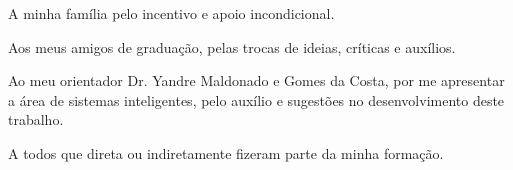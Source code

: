 
\begin{agradecimentos}[AGRADECIMENTOS]

A minha família pelo incentivo e apoio incondicional.
\par Aos meus amigos de graduação, pelas trocas de ideias, críticas e auxílios.
\par Ao meu orientador Dr. Yandre Maldonado e Gomes da Costa, por me apresentar a área de sistemas inteligentes, pelo auxílio e sugestões no desenvolvimento deste trabalho.
\par A todos que direta ou indiretamente fizeram parte da minha formação. 
\end{agradecimentos}
